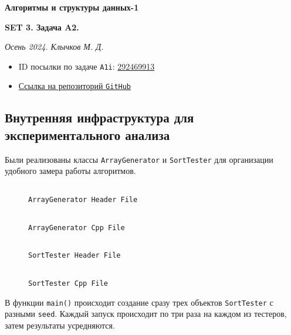 \documentclass[11pt,a4paper]{scrarticle}
\author{Клычков Максим Дмитриевич}
\theoremstyle{definition}
\begin{document}
\centerline{\textbf{\huge Алгоритмы и структуры данных-1}}
\centerline{\textbf{SET 3. Задача A2.}}
\begin{flushright}
	\emph{Осень 2024. Клычков М. Д.}
\end{flushright}

\begin{itemize}
	\item ID посылки по задаче \texttt{A1i}: \href{https://dsahse.contest.codeforces.com/group/NOflOR1Qt0/contest/565612/submission/292469913}{292469913}
	\item \href{https://github.com/maklybae/algorithms/tree/main/set03/a2}{Ссылка на репозиторий \texttt{GitHub}}
\end{itemize}

\subsection*{Внутренняя инфраструктура для экспериментального анализа}

Были реализованы классы \texttt{ArrayGenerator} и \texttt{SortTester} для организации удобного замера работы алгоритмов.

\begin{figure}[htp]
	\centering
	\inputminted[linenos,fontsize=\small]{cpp}{../analyze/generator.h}
	\caption{\texttt{ArrayGenerator Header File}}
	\label{code:generator-h}
\end{figure}
\FloatBarrier

\begin{figure}[htp]
	\centering
	\inputminted[linenos,fontsize=\small]{cpp}{../analyze/generator.cpp}
	\caption{\texttt{ArrayGenerator Cpp File}}
	\label{code:generator-cpp}
\end{figure}
\FloatBarrier

\begin{figure}[htp]
	\centering
	\inputminted[linenos,fontsize=\small]{cpp}{../analyze/tester.h}
	\caption{\texttt{SortTester Header File}}
	\label{code:tester-h}
\end{figure}
\FloatBarrier

\begin{figure}[htp]
	\centering
	\inputminted[linenos,fontsize=\small]{cpp}{../analyze/tester.cpp}
	\caption{\texttt{SortTester Cpp File}}
	\label{code:tester-cpp}
\end{figure}
\FloatBarrier

В функции \texttt{main()} происходит создание сразу трех объектов \texttt{SortTester} с разными \texttt{seed}. Каждый запуск происходит по три раза на каждом из тестеров, затем результаты усредняются.
\end{document}
